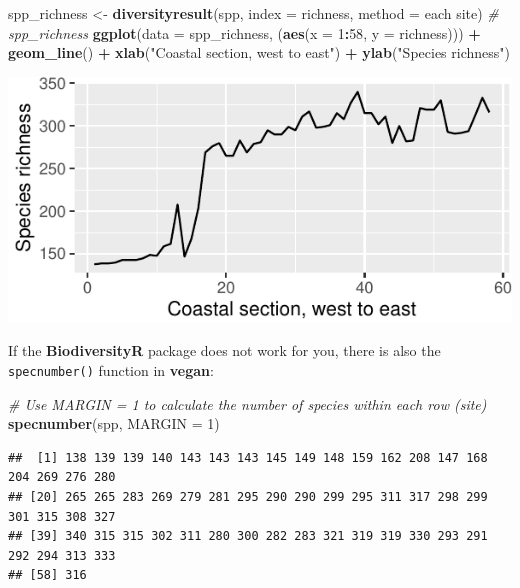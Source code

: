 \documentclass[10pt,a4,]{article}
\newenvironment{Shaded}{\begin{snugshade}}{\end{snugshade}}
\newcommand{\CommentTok}[1]{\textcolor[rgb]{0.56,0.35,0.01}{\textit{#1}}}
\newcommand{\DataTypeTok}[1]{\textcolor[rgb]{0.13,0.29,0.53}{#1}}
\newcommand{\DecValTok}[1]{\textcolor[rgb]{0.00,0.00,0.81}{#1}}
\newcommand{\KeywordTok}[1]{\textcolor[rgb]{0.13,0.29,0.53}{\textbf{#1}}}
\newcommand{\NormalTok}[1]{#1}
\newcommand{\OperatorTok}[1]{\textcolor[rgb]{0.81,0.36,0.00}{\textbf{#1}}}
\newcommand{\StringTok}[1]{\textcolor[rgb]{0.31,0.60,0.02}{#1}}
\begin{document}
\begin{Shaded}
\begin{Highlighting}[]
\NormalTok{spp\_richness <{-}}\StringTok{ }\KeywordTok{diversityresult}\NormalTok{(spp, }\DataTypeTok{index =} \StringTok{\textquotesingle{}richness\textquotesingle{}}\NormalTok{, }\DataTypeTok{method =} \StringTok{\textquotesingle{}each site\textquotesingle{}}\NormalTok{)}
\CommentTok{\# spp\_richness}
\KeywordTok{ggplot}\NormalTok{(}\DataTypeTok{data =}\NormalTok{ spp\_richness, (}\KeywordTok{aes}\NormalTok{(}\DataTypeTok{x =} \DecValTok{1}\OperatorTok{:}\DecValTok{58}\NormalTok{, }\DataTypeTok{y =}\NormalTok{ richness))) }\OperatorTok{+}
\StringTok{  }\KeywordTok{geom\_line}\NormalTok{() }\OperatorTok{+}\StringTok{ }\KeywordTok{xlab}\NormalTok{(}\StringTok{"Coastal section, west to east"}\NormalTok{) }\OperatorTok{+}\StringTok{ }\KeywordTok{ylab}\NormalTok{(}\StringTok{"Species richness"}\NormalTok{)}
\end{Highlighting}
\end{Shaded}

\begin{center}\includegraphics{compliled_figures/unnamed-chunk-3-1} \end{center}

If the \textbf{BiodiversityR} package does not work for you, there is
also the \texttt{specnumber()} function in \textbf{vegan}:

\begin{Shaded}
\begin{Highlighting}[]
\CommentTok{\# Use \textquotesingle{}MARGIN = 1\textquotesingle{} to calculate the number of species within each row (site)}
\KeywordTok{specnumber}\NormalTok{(spp, }\DataTypeTok{MARGIN =} \DecValTok{1}\NormalTok{)}
\end{Highlighting}
\end{Shaded}

\begin{verbatim}
##  [1] 138 139 139 140 143 143 143 145 149 148 159 162 208 147 168 204 269 276 280
## [20] 265 265 283 269 279 281 295 290 290 299 295 311 317 298 299 301 315 308 327
## [39] 340 315 315 302 311 280 300 282 283 321 319 319 330 293 291 292 294 313 333
## [58] 316
\end{verbatim}
\end{document}
